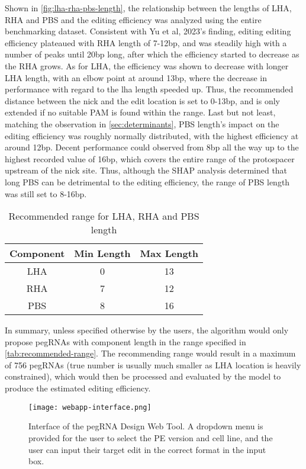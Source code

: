 Shown in \autoref{fig:lha-rha-pbs-length}, the relationship between the lengths of LHA, RHA and PBS and the editing efficiency was analyzed using the entire benchmarking dataset. Consistent with Yu et al, 2023's finding, editing editing efficiency plateaued with RHA length of 7-12bp, and was steadily high with a number of peaks until 20bp long, after which the efficiency started to decrease as the RHA grows. As for LHA, the efficiency was shown to decrease with longer LHA length, with an elbow point at around 13bp, where the decrease in performance with regard to the lha length speeded up. Thus, the recommended distance between the nick and the edit location is set to 0-13bp, and is only extended if no suitable PAM is found within the range. Last but not least, matching the observation in \autoref{sec:determinants}, PBS length's impact on the editing efficiency was roughly normally distributed, with the highest efficiency at around 12bp. Decent performance could observed from 8bp all the way up to the highest recorded value of 16bp, which covers the entire range of the protospacer upstream of the nick site. Thus, although the SHAP analysis determined that long PBS can be detrimental to the editing efficiency, the range of PBS length was still set to 8-16bp.

\begin{table}[ht]
    \centering
    \begin{tabular}{c|c|c}
        \textbf{Component} & \textbf{Min Length} & \textbf{Max Length} \\
        \hline
        LHA & 0 & 13 \\
        RHA & 7 & 12 \\
        PBS & 8 & 16 \\
    \end{tabular}
    \caption{Recommended range for LHA, RHA and PBS length}
    \label{tab:recommended-range}
\end{table}

In summary, unless specified otherwise by the users, the algorithm would only propose pegRNAs with component length in the range specified in \autoref{tab:recommended-range}. The recommending range would result in a maximum of 756 pegRNAs (true number is usually much smaller as LHA location is heavily constrained), which would then be processed and evaluated by the model to produce the estimated editing efficiency.

\begin{figure}
    \centering
    \texttt{[image: webapp-interface.png]}
    \caption[pegRNA Design Web Tool Interface]{Interface of the pegRNA Design Web Tool. A dropdown menu is provided for the user to select the PE version and cell line, and the user can input their target edit in the correct format in the input box.}
    \label{fig:webtool}
\end{figure}




